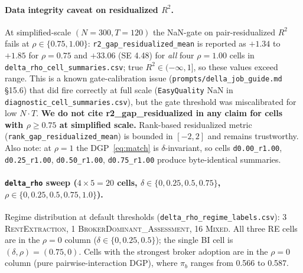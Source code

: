 \documentclass[11pt,a4paper]{article}
\begin{document}
\paragraph{Data integrity caveat on residualized $R^2$.} At simplified-scale $(N{=}300, T{=}120)$ the NaN-gate on pair-residualized $R^2$ fails at $\rho\in\{0.75,1.00\}$: \texttt{r2\_gap\_residualized\_mean} is reported as $+1.34$ to $+1.85$ for $\rho{=}0.75$ and $+33.06$ (SE 4.48) for \emph{all} four $\rho{=}1.00$ cells in \texttt{delta\_rho\_cell\_summaries.csv}; true $R^2\in(-\infty,1]$, so these values exceed range. This is a known gate-calibration issue (\texttt{prompts/della\_job\_guide.md} §15.6) that did fire correctly at full scale (\texttt{EasyQuality} NaN in \texttt{diagnostic\_cell\_summaries.csv}), but the gate threshold was miscalibrated for low $N \cdot T$. \textbf{We do not cite r2\_gap\_residualized in any claim for cells with $\rho\ge 0.75$ at simplified scale.} Rank-based residualized metric (\texttt{rank\_gap\_residualized\_mean}) is bounded in $[-2,2]$ and remains trustworthy. Also note: at $\rho{=}1$ the DGP~\eqref{eq:match} is $\delta$-invariant, so cells \texttt{d0.00\_r1.00}, \texttt{d0.25\_r1.00}, \texttt{d0.50\_r1.00}, \texttt{d0.75\_r1.00} produce byte-identical summaries.

\paragraph{\texttt{delta\_rho} sweep ($4\times 5 = 20$ cells, $\delta\in\{0,0.25,0.5,0.75\}$, $\rho\in\{0,0.25,0.5,0.75,1.0\}$).}
Regime distribution at default thresholds (\texttt{delta\_rho\_regime\_labels.csv}): 3 \textsc{RentExtraction}, 1 \textsc{BrokerDominant\_Assessment}, 16 \textsc{Mixed}. All three \textsc{RE} cells are in the $\rho{=}0$ column ($\delta\in\{0,0.25,0.5\}$); the single \textsc{BI} cell is $(\delta,\rho){=}(0.75,0)$. Cells with the strongest broker adoption are in the $\rho{=}0$ column (pure pairwise-interaction DGP), where $\pi_b$ ranges from 0.566 to 0.587.
\end{document}
